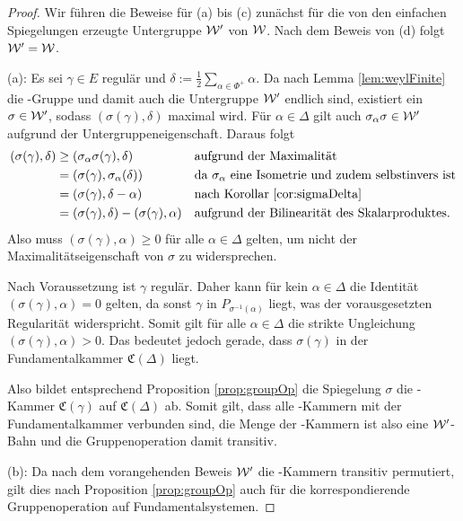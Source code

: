 \begin{proof}
  Wir führen die Beweise für (a) bis (c) zunächst für die von den einfachen Spiegelungen erzeugte Untergruppe $\mathcal{W}'$ von $\mathcal{W}$.
  Nach dem Beweis von (d) folgt $\mathcal{W}' = \mathcal{W}$.

  (a):
  Es sei $\gamma \in E$ regulär und $\delta := \tfrac{1}{2} \sum_{\alpha \in \Phi^+} \alpha$.
  Da nach Lemma \ref{lem:weylFinite} die \weyl\hyp{}Gruppe und damit auch die Untergruppe $\mathcal{W}'$ endlich sind, existiert ein $\sigma \in \mathcal{W}'$, sodass $(\sigma(\gamma), \delta)$ maximal wird.
  Für $\alpha \in \Delta$ gilt auch $\sigma_\alpha\sigma \in \mathcal{W}'$ aufgrund der Untergruppeneigenschaft.
  Daraus folgt
  \begin{align*}
    (\sigma(\gamma), \delta) 
    &\geq (\sigma_\alpha \sigma(\gamma), \delta) &&\text{aufgrund der Maximalität} \\
    &= (\sigma(\gamma), \sigma_\alpha(\delta)) &&\text{da $\sigma_\alpha$ eine Isometrie und zudem selbstinvers ist} \\
    &= (\sigma(\gamma), \delta - \alpha) &&\text{nach Korollar \ref{cor:sigmaDelta}} \\
    &= (\sigma(\gamma), \delta) - (\sigma(\gamma), \alpha) &&\text{aufgrund der Bilinearität des Skalarproduktes.}
  \end{align*}
  Also muss $(\sigma(\gamma), \alpha) \geq 0$ für alle $\alpha \in \Delta$ gelten, um nicht der Maximalitätseigenschaft von $\sigma$ zu widersprechen.

  Nach Voraussetzung ist $\gamma$ regulär.
  Daher kann für kein $\alpha \in \Delta$ die Identität $(\sigma(\gamma),\alpha) = 0$ gelten, da sonst $\gamma$ in $P_{\sigma^{-1}(\alpha)}$ liegt, was der vorausgesetzten Regularität widerspricht.
  Somit gilt für alle $\alpha \in \Delta$ die strikte Ungleichung $(\sigma(\gamma), \alpha) > 0$.
  Das bedeutet jedoch gerade, dass $\sigma(\gamma)$ in der Fundamentalkammer $\mathfrak{C}(\Delta)$ liegt.

  Also bildet entsprechend Proposition \ref{prop:groupOp} die Spiegelung $\sigma$ die \weyl\hyp{}Kammer $\mathfrak{C}(\gamma)$ auf $\mathfrak{C}(\Delta)$ ab. 
  Somit gilt, dass alle \weyl\hyp{}Kammern mit der Fundamentalkammer verbunden sind, die Menge der \weyl\hyp{}Kammern ist also eine $\mathcal{W}'$-Bahn und die Gruppenoperation damit transitiv.


  (b):
  Da nach dem vorangehenden Beweis $\mathcal{W}'$ die \weyl\hyp{}Kammern transitiv permutiert, gilt dies nach Proposition \ref{prop:groupOp} auch für die korrespondierende Gruppenoperation auf Fundamentalsystemen.


\end{proof}
